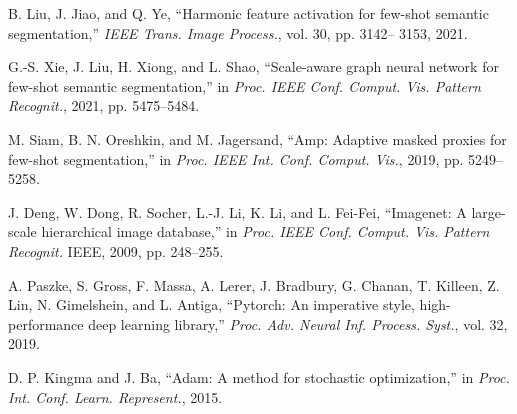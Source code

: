 \documentclass[lettersize,journal]{IEEEtran}
\begin{document}
\begin{thebibliography}{10}
B. Liu, J. Jiao, and Q. Ye, “Harmonic feature activation for few-shot semantic segmentation,” \textit{IEEE Trans. Image Process.}, vol. 30, pp. 3142– 3153, 2021.

G.-S. Xie, J. Liu, H. Xiong, and L. Shao, “Scale-aware graph neural network for few-shot semantic segmentation,” in \textit{Proc. IEEE Conf. Comput. Vis. Pattern Recognit.}, 2021, pp. 5475–5484.

M. Siam, B. N. Oreshkin, and M. Jagersand, “Amp: Adaptive masked proxies for few-shot segmentation,” in \textit{Proc. IEEE Int. Conf. Comput. Vis.}, 2019, pp. 5249–5258.

J. Deng, W. Dong, R. Socher, L.-J. Li, K. Li, and L. Fei-Fei, “Imagenet: A large-scale hierarchical image database,” in \textit{Proc. IEEE Conf. Comput. Vis. Pattern Recognit.} IEEE, 2009, pp. 248–255.

A. Paszke, S. Gross, F. Massa, A. Lerer, J. Bradbury, G. Chanan, T. Killeen, Z. Lin, N. Gimelshein, and L. Antiga, “Pytorch: An imperative style, high-performance deep learning library,” \textit{Proc. Adv. Neural Inf. Process. Syst.}, vol. 32, 2019.

D. P. Kingma and J. Ba, “Adam: A method for stochastic optimization,” in \textit{Proc. Int. Conf. Learn. Represent.}, 2015.


\end{thebibliography}
\end{document}
